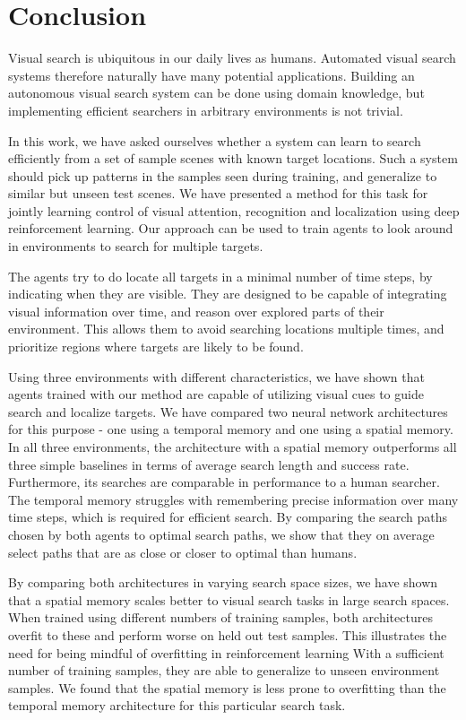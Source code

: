 \chapter{Conclusion}
\label{cha:conclusion}

Visual search is ubiquitous in our daily lives as humans.
Automated visual search systems therefore naturally have many potential applications.
Building an autonomous visual search system can be done using domain knowledge, but implementing efficient searchers in arbitrary environments is not trivial.

In this work, we have asked ourselves whether a system can learn to search efficiently from a set of sample scenes with known target locations.
Such a system should pick up patterns in the samples seen during training, and generalize to similar but unseen test scenes.
We have presented a method for this task for jointly learning control of visual attention, recognition and localization using deep reinforcement learning.
Our approach can be used to train agents to look around in environments to search for multiple targets.

The agents try to do locate all targets in a minimal number of time steps, by indicating when they are visible.
They are designed to be capable of integrating visual information over time, and reason over explored parts of their environment.
This allows them to avoid searching locations multiple times, and prioritize regions where targets are likely to be found.

Using three environments with different characteristics, we have shown that agents trained with our method are capable of utilizing visual cues to guide search and localize targets.
We have compared two neural network architectures for this purpose - one using a temporal memory and one using a spatial memory.
In all three environments, the architecture with a spatial memory outperforms all three simple baselines in terms of average search length and success rate.
Furthermore, its searches are comparable in performance to a human searcher.
The temporal memory struggles with remembering precise information over many time steps, which is required for efficient search.
By comparing the search paths chosen by both agents to optimal search paths, we show that they on average select paths that are as close or closer to optimal than humans.

By comparing both architectures in varying search space sizes, we have shown that a spatial memory scales better to visual search tasks in large search spaces.
When trained using different numbers of training samples, both architectures overfit to these and perform worse on held out test samples.
This illustrates the need for being mindful of overfitting in reinforcement learning
With a sufficient number of training samples, they are able to generalize to unseen environment samples.
We found that the spatial memory is less prone to overfitting than the temporal memory architecture for this particular search task.

